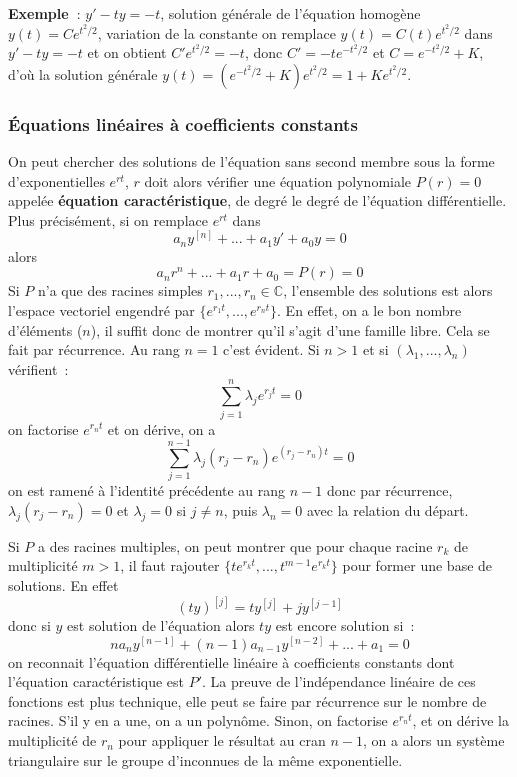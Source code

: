 \documentclass[a4paper,11pt]{article}
\begin{document}
\begin{giacjshere}
{\bf Exemple~}: $y'-ty=-t$, solution g\'en\'erale de l'\'equation
homog\`ene $y(t)=Ce^{t^2/2}$, variation de la constante
on remplace $y(t)=C(t)e^{t^2/2}$ dans $y'-ty=-t$ et on obtient
$C' e^{t^2/2}=-t$, donc $C'=-te^{-t^2/2}$ et $C=e^{-t^2/2}+K$,
d'o\`u la solution g\'en\'erale $y(t)=(e^{-t^2/2}+K)e^{t^2/2}=1+Ke^{t^2/2}$.

\subsubsection{\'Equations lin\'eaires \`a coefficients constants}
On peut chercher des solutions de l'\'equation sans second membre
sous la forme d'exponentielles
$e^{rt}$, $r$ doit alors v\'erifier une \'equation polynomiale $P(r)=0$
appel\'ee {\bf \'equation caract\'eristique},
de degr\'e le degr\'e de l'\'equation diff\'erentielle. 
Plus pr\'ecis\'ement, si on remplace $e^{rt}$ dans
$$ a_n y^{[n]}+...+a_1 y'+a_0y=0$$ alors
$$ a_n r^n +...+a_1r +a_0=P(r)=0$$
Si  $P$ n'a que des racines simples $r_1,...,r_n \in \mathbb{C}$, 
l'ensemble des solutions
est alors l'espace vectoriel engendr\'e par 
$\{ e^{r_1t}, ... , e^{r_nt} \}$.
En effet, on a le bon nombre
d'\'el\'ements ($n$), il suffit donc de montrer 
qu'il s'agit d'une famille libre. Cela se fait
par r\'ecurrence. Au rang $n=1$ c'est \'evident.
Si $n>1$ et si $(\lambda_1,...,\lambda_n)$ v\'erifient~:
$$ \sum_{j=1}^n \lambda_j e^{r_jt} = 0$$
on factorise $e^{r_n t}$ et on d\'erive, on a
$$ \sum_{j=1}^{n-1} \lambda_j (r_j-r_n) e^{(r_j-r_n)t} =0 $$
on est ramen\'e \`a l'identit\'e pr\'ec\'edente au rang $n-1$
donc par r\'ecurrence, $\lambda_j (r_j-r_n)=0$ et $\lambda_j=0$
si $j \neq n$, puis $\lambda_n=0$ avec la relation du d\'epart.

Si $P$ a des racines multiples, on peut montrer que pour chaque
racine $r_k$ de multiplicit\'e $m>1$, il faut rajouter
$\{ te^{r_kt}, ..., t^{m-1} e^{r_kt} \}$ pour former une base
de solutions. En effet
$$ (ty)^{[j]} = t y^{[j]} + j y^{[j-1]}$$
donc si $y$ est solution de l'\'equation alors $ty$ est encore solution
si~:
$$na_n y^{[n-1]} + (n-1)a_{n-1} y^{[n-2]}+...+a_1=0$$
on reconnait l'\'equation diff\'erentielle lin\'eaire \`a coefficients
constants dont l'\'equation caract\'eristique est $P'$.
La preuve de l'ind\'ependance lin\'eaire de ces fonctions
est plus technique, elle peut se faire 
par r\'ecurrence sur le nombre de racines. S'il y
en a une, on a un polyn\^ome. Sinon, on factorise $e^{r_nt}$,
et on d\'erive la multiplicit\'e de $r_n$ pour appliquer
le r\'esultat au cran $n-1$, on a alors un syst\`eme triangulaire
sur le groupe d'inconnues de la m\^eme exponentielle.


\end{giacjshere}
\end{document}
